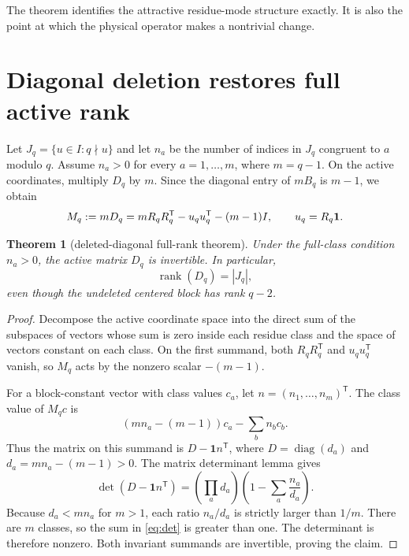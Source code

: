\documentclass[11pt]{article}
\newtheorem{theorem}{Theorem}
\begin{document}
The theorem identifies the attractive residue-mode structure exactly.  It is
also the point at which the physical operator makes a nontrivial change.

\section{Diagonal deletion restores full active rank}

Let $J_q=\{u\in I:q\nmid u\}$ and let $n_a$ be the number of indices in
$J_q$ congruent to $a$ modulo $q$.  Assume $n_a>0$ for every
$a=1,\ldots,m$, where $m=q-1$.  On the active coordinates, multiply $D_q$ by
$m$.  Since the diagonal entry of $mB_q$ is $m-1$, we obtain
\begin{equation}
 M_q:=mD_q=mR_qR_q^{\mathsf T}-u_qu_q^{\mathsf T}-(m-1)I,
 \qquad u_q=R_q{\bf1}.
 \label{eq:M}
\end{equation}

\begin{theorem}[deleted-diagonal full-rank theorem]
Under the full-class condition $n_a>0$, the active matrix $D_q$ is invertible.
In particular,
\[
 \operatorname{rank}(D_q)=|J_q|,
\]
even though the undeleted centered block has rank $q-2$.
\end{theorem}

\begin{proof}
Decompose the active coordinate space into the direct sum of the subspaces
of vectors whose sum is zero inside each residue class and the space of vectors
constant on each class.  On the first summand, both $R_qR_q^{\mathsf T}$ and
$u_qu_q^{\mathsf T}$ vanish, so $M_q$ acts by the nonzero scalar $-(m-1)$.

For a block-constant vector with class values $c_a$, let
$n=(n_1,\ldots,n_m)^{\mathsf T}$.  The class value of $M_qc$ is
\[
 (mn_a-(m-1))c_a-\sum_b n_bc_b.
\]
Thus the matrix on this summand is $D-\mathbf{1}n^{\mathsf T}$, where
$D=\operatorname{diag}(d_a)$ and $d_a=mn_a-(m-1)>0$.  The matrix determinant
lemma gives
\begin{equation}
 \det(D-\mathbf{1}n^{\mathsf T})
 =\left(\prod_a d_a\right)
 \left(1-\sum_a\frac{n_a}{d_a}\right).
 \label{eq:det}
\end{equation}
Because $d_a<mn_a$ for $m>1$, each ratio $n_a/d_a$ is strictly larger than
$1/m$.  There are $m$ classes, so the sum in \eqref{eq:det} is greater than
one.  The determinant is therefore nonzero.  Both invariant summands are
invertible, proving the claim.
\end{proof}
\end{document}
